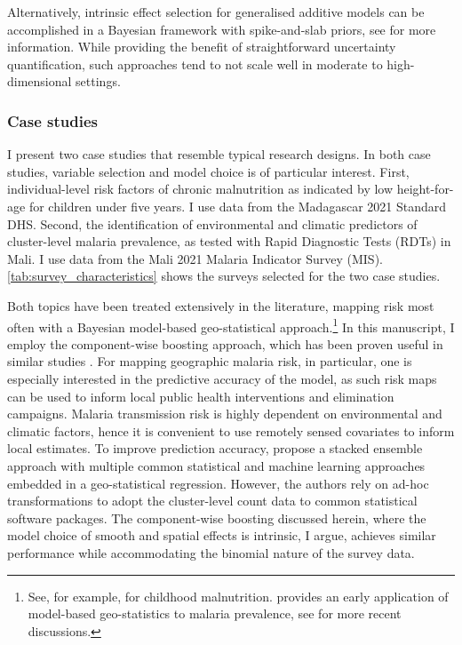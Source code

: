 Alternatively, intrinsic effect selection for generalised additive models can be accomplished in a Bayesian framework with spike-and-slab priors, see \textcite{scheiplSpikeandSlabPriorsFunction2012, kleinBayesianEffectSelection2021} for more information. While providing the benefit of straightforward uncertainty quantification, such approaches tend to not scale well in moderate to high-dimensional settings. 


\subsubsection*{Case studies}\label{sec:case-studies}

I present two case studies that resemble typical research designs. In both case studies, variable selection and model choice is of particular interest. First, individual-level risk factors of chronic malnutrition as indicated by low height-for-age for children under five years. I use data from the Madagascar 2021 Standard DHS. Second, the identification of environmental and climatic predictors of cluster-level malaria prevalence, as tested with Rapid Diagnostic Tests (RDTs) in Mali. I use data from the Mali 2021 Malaria Indicator Survey (MIS). \autoref{tab:survey_characteristics} shows the surveys selected for the two case studies. 



Both topics have been treated extensively in the literature, mapping risk most often with a Bayesian model-based geo-statistical approach.\footnote{See, for example, \textcite{ahetoModellingForecastingSpatiotemporal2017, kinyokiMappingChildGrowth2020, egbonModelingSpatialPattern2022, uwiringiyimanaBayesianGeostatisticalModelling2022} for childhood malnutrition. \textcite{diggleChildhoodMalariaGambia2002} provides an early application of model-based geo-statistics to malaria prevalence, see \textcite{weissMappingGlobalPrevalence2019, ejiguGeostatisticalAnalysisMapping2020, nzabakirirahoGeostatisticalModelingMalaria2021} for more recent discussions.} In this manuscript, I employ the component-wise boosting approach, which has been proven useful in similar studies \autocite{fenskeIdentifyingRiskFactors2011, torresmunguiaExaminingGenderInequalities2021}. For mapping geographic malaria risk, in particular, one is especially interested in the predictive accuracy of the model, as such risk maps can be used to inform local public health interventions and elimination campaigns. Malaria transmission risk is highly dependent on environmental and climatic factors, hence it is convenient to use remotely sensed covariates to inform local estimates. To improve prediction accuracy, \textcite{bhattImprovedPredictionAccuracy2017} propose a stacked ensemble approach with multiple common statistical and machine learning approaches embedded in a geo-statistical regression. However, the authors rely on ad-hoc transformations to adopt the cluster-level count data to common statistical software packages. The component-wise boosting discussed herein, where the model choice of smooth and spatial effects is intrinsic, I argue, achieves similar performance while accommodating the binomial nature of the survey data. 


